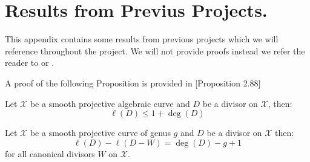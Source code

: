 \chapter{Results from Previus Projects.}
This appendix contains some results from previous projects which we will reference throughout the project.
We will not provide proofs instead we refer the reader to \cite{bachellor} or \cite{Fulton}.

A proof of the following Proposition is provided in \cite{bachellor}[Proposition 2.88]
\begin{proposition}\label{prop:2.88}
  Let $\mathcal{X}$ be a smooth projective algebraic curve and $D$ be a divisor on $\mathcal{X}$, then:
  \begin{equation*}
    \ell(D) \leq 1 + \deg(D)
  \end{equation*}
\end{proposition}

\begin{theorem}\label{thm:RR}
  Let $\mathcal{X}$ be a smooth projective curve of genus $g$ and $D$ be a divisor on $\mathcal{X}$ then:
  \begin{equation*}
    \ell(D) - \ell(D - W) = \deg(D) - g + 1
  \end{equation*}
  for all canonical divisors $W$ on $\mathcal{X}$.
\end{theorem}

